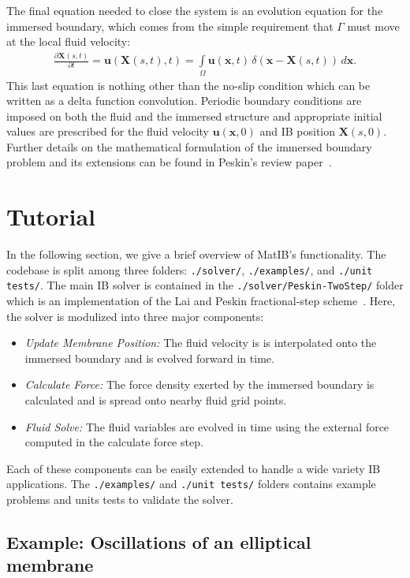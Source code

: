\documentclass{article}
\newcommand{\mycode}[1]{\texttt{#1}}
\newcommand{\bs}[1]{\boldsymbol{#1}}
\newcommand{\pd}[2]{\frac{\partial #1}{\partial #2}}
\begin{document}
The final equation needed to close the system is an evolution equation
for the immersed boundary, which comes from the simple requirement that
$\Gamma$ must move at the local fluid velocity:
\begin{gather}
  \label{eq:membrane}
  \pd{\bs{X}(s,t)}{t} = \bs{u}(\bs{X}(s,t),t) = \int\limits_\Omega
  \bs{u}(\bs{x},t) \, \delta(\bs{x}-\bs{X}(s,t)) \, d\bs{x}. 
\end{gather}
This last equation is nothing other than the no-slip condition which can 
be written as a delta function convolution.  Periodic boundary conditions are imposed on both
the fluid and the immersed structure and appropriate initial values are
prescribed for the fluid velocity $\bs{u}(\bs{x},0)$ and IB position
$\bs{X}(s,0)$.  Further details on the mathematical formulation of the
immersed boundary problem and its extensions can be
found in Peskin's review paper~\cite{PeskinIB}.

\section{Tutorial}\label{sec:Tutorial}

In the following section, we give a brief overview of MatIB's functionality. The codebase is split
among three folders: \mycode{./solver/}, \mycode{./examples/}, and \mycode{./unit tests/}.
The main IB solver is contained in the \mycode{./solver/Peskin-TwoStep/} folder which 
is an implementation of the Lai and Peskin fractional-step scheme~\cite{PeskinIB}. Here, 
the solver is modulized into three major components:
\begin{itemize}
\item \emph{Update Membrane Position:} The fluid velocity is
  is interpolated onto the immersed boundary and is evolved forward in time.
\item \emph{Calculate Force:} The force density exerted by the
  immersed boundary is calculated and is spread onto nearby fluid grid points.
\item \emph{Fluid Solve:} The fluid variables are evolved in time
  using the external force computed in the calculate force step.
\end{itemize}
Each of these components can be easily extended to handle a wide variety IB applications.
The \mycode{./examples/} and \mycode{./unit tests/} folders contains example problems 
and units tests to validate the solver. 

\subsection{Example: Oscillations of an elliptical membrane}\label{sec:EllipticalMembrane}
\end{document}
